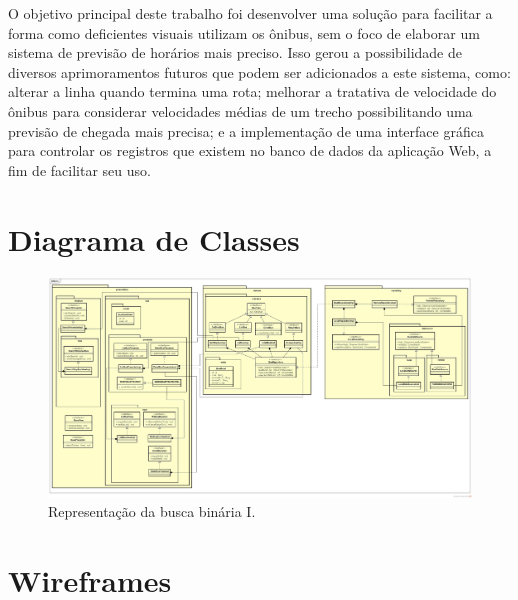 \documentclass[
	12pt,				%
	oneside,			%
	a4paper,			%
	brazil				%
]{abntex2}
\begin{document}
O objetivo principal deste trabalho foi desenvolver uma solução para facilitar a forma como deficientes visuais utilizam os ônibus, sem o foco de elaborar um sistema de previsão de horários mais preciso. Isso gerou a possibilidade de diversos aprimoramentos futuros que podem ser adicionados a este sistema, como: alterar a linha quando termina uma rota; melhorar a tratativa de velocidade do ônibus para considerar velocidades médias de um trecho possibilitando uma previsão de chegada mais precisa; e a implementação de uma interface gráfica para controlar os registros que existem no banco de dados da aplicação Web, a fim de facilitar seu uso.

\postextual



\begin{apendicesenv}
\partapendices

\chapter{Diagrama de Classes}

\begin{figure}[H]
\centering
\includegraphics[angle=90, width=12cm, center]{images/app-class-diagram}
\caption{Representação da busca binária I.}
\label{Rotulo}
\end{figure}

\chapter{Wireframes}


\end{apendicesenv}
\end{document}
